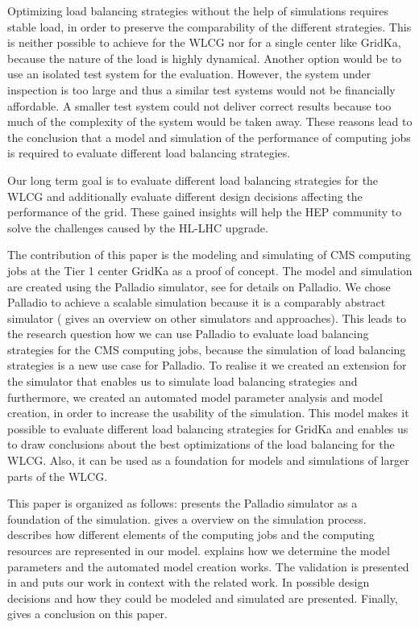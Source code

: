 \documentclass{webofc}
\begin{document}
Optimizing load balancing strategies without the help of simulations requires stable load, in order to preserve the comparability of the different strategies. This is neither possible to achieve for the WLCG nor for a single center like GridKa, because the nature of the load is highly dynamical. Another option would be to use an isolated test system for the evaluation. However, the system under inspection is too large and thus a similar test systems would not be financially affordable. A smaller test system could not deliver correct results because too much of the complexity of the system would be taken away.
These reasons lead to the conclusion that a model and simulation of the performance of computing jobs is required to evaluate different load balancing strategies.

Our long term goal is to evaluate different load balancing strategies for the WLCG and additionally evaluate different design decisions affecting the performance of the grid. These gained insights will help the HEP community to solve the challenges caused by the HL-LHC upgrade.

The contribution of this paper is the modeling and simulating of CMS computing jobs at the Tier 1 center GridKa as a proof of concept.
The model and simulation are created using the Palladio simulator, see  for details on Palladio. We chose Palladio to achieve a scalable simulation because it is a comparably abstract simulator ( gives an overview on other simulators and approaches).
This leads to the research question how we can use Palladio to evaluate load balancing strategies for the CMS computing jobs, because the simulation of load balancing strategies is a new use case for Palladio. To realise it we created an extension for the simulator that enables us to simulate load balancing strategies and furthermore, we created an automated model parameter analysis and model creation, in order to increase the usability of the simulation.
This model makes it possible to evaluate different load balancing strategies for GridKa and enables us to draw conclusions about the best optimizations of the load balancing for the WLCG. Also, it can be used as a foundation for models and simulations of larger parts of the WLCG.


This paper is organized as follows:  presents the Palladio simulator as a foundation of the simulation.  gives a overview on the simulation process.  describes how different elements of the computing jobs and the computing resources are represented in our model.  explains how we determine the model parameters and the automated model creation works. The validation is presented in  and  puts our work in context with the related work. In  possible design decisions and how they could be modeled and simulated are presented. Finally,  gives a conclusion on this paper.
\end{document}
